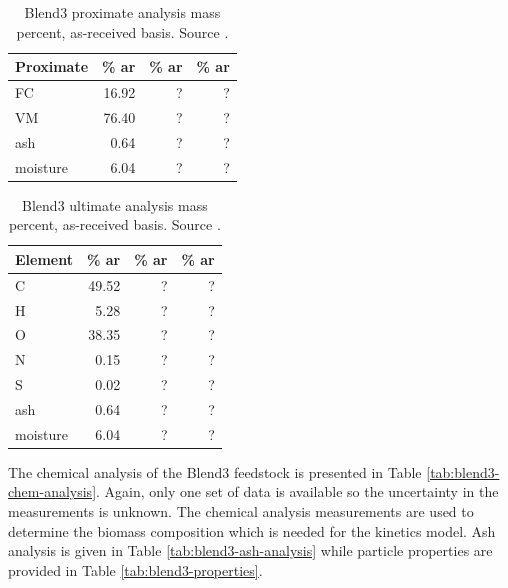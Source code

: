 \begin{table}[H]
    \centering
    \caption{Blend3 proximate analysis mass percent, as-received basis. Source \cite{Choratch-2017}.}
    \label{tab:blend3-prox}
    \begin{tabular}{lrrr}
        \toprule
        Proximate & \% ar & \% ar & \% ar \\
        \midrule
        FC        & 16.92 & ? & ? \\
        VM        & 76.40 & ? & ? \\
        ash       & 0.64  & ? & ? \\
        moisture  & 6.04  & ? & ? \\
        \bottomrule
    \end{tabular}
\end{table}

\begin{table}[H]
    \centering
    \caption{Blend3 ultimate analysis mass percent, as-received basis. Source \cite{Choratch-2017}.}
    \label{tab:blend3-ult}
    \begin{tabular}{lrrr}
        \toprule
        Element & \% ar & \% ar & \% ar \\
        \midrule
        C        & 49.52   & ? & ? \\
        H        & 5.28    & ? & ? \\
        O        & 38.35   & ? & ? \\
        N        & 0.15    & ? & ? \\
        S        & 0.02    & ? & ? \\
        ash      & 0.64    & ? & ? \\
        moisture & 6.04    & ? & ? \\
        \bottomrule
    \end{tabular}
\end{table}

The chemical analysis of the Blend3 feedstock is presented in Table \ref{tab:blend3-chem-analysis}. Again, only one set of data is available so the uncertainty in the measurements is unknown. The chemical analysis measurements are used to determine the biomass composition which is needed for the kinetics model. Ash analysis is given in Table \ref{tab:blend3-ash-analysis} while particle properties are provided in Table \ref{tab:blend3-properties}.

